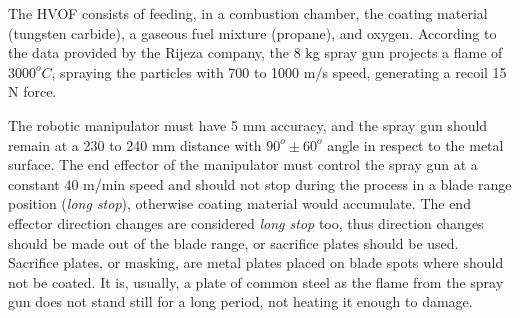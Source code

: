 The HVOF consists of feeding, in a combustion chamber, the coating material
(tungsten carbide), a gaseous fuel mixture (propane), and oxygen. According to
the data provided by the Rijeza company, the 8 kg spray gun projects a flame of
$3000^oC$, spraying the particles with 700 to 1000 m/s speed, generating a
recoil 15 N force.

The robotic manipulator must have 5 mm accuracy, and the spray gun should remain
at a 230 to 240 mm distance with $90^o\pm 60^o$ angle in respect to the metal
surface. The end effector of the manipulator must control the spray
gun at a constant 40 m/min speed and should not stop during the process in a blade range
position (\textit{long stop}), otherwise coating material would accumulate.
The end effector direction changes are considered \textit{long stop} too, thus
direction changes should be made out of the blade range, or sacrifice plates
should be used. Sacrifice plates, or masking, are metal plates placed on blade
spots where should not be coated. It is, usually, a plate of common steel as the
flame from the spray gun does not stand still for a long period, not heating it
enough to damage. 

